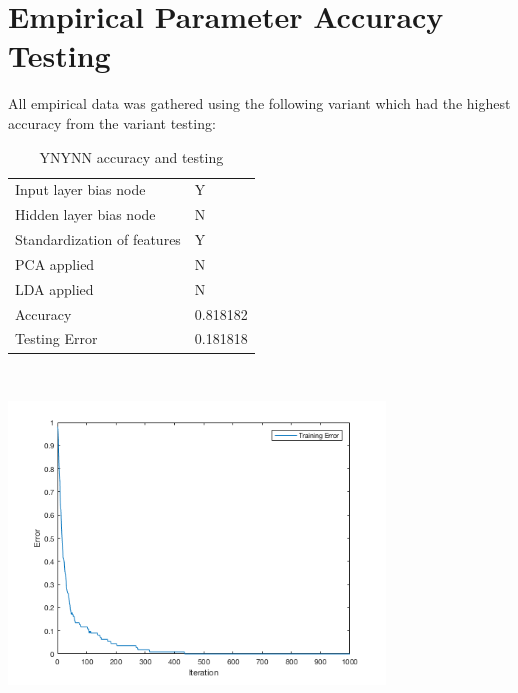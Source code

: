 \documentclass[12pt]{article}
\newcommand{\accuracyAndTestErrorTable}[8]{
  \begin{tabular}{l|l}
    \hline
    Input layer bias node & #1 \\
    Hidden layer bias node & #2 \\
    Standardization of features & #3 \\
    PCA applied & #4 \\
    LDA applied & #5 \\
    \hline
    Accuracy & #6 \\
    Testing Error & #7 \\
    \hline
  \end{tabular}
  ~\\[60pt]
  \caption{#8}
}
\begin{document}

\section{Empirical Parameter Accuracy Testing}
All empirical data was gathered using the following variant which had the highest accuracy from the variant testing:
\begin{center}
  \begin{table}[H]
    \begin{varwidth}[b]{0.4\linewidth}
      \centering
      \accuracyAndTestErrorTable{Y}{N}{Y}{N}{N}{0.818182}{0.181818}{YNYNN accuracy and testing}
      \label{table:param_base}
    \end{varwidth}%
    \hfill
    \begin{minipage}[b]{0.6\linewidth}
      \centering
      \includegraphics[width=100mm]{YNYNN_training_error.png}
      \label{fig:param_base}
    \end{minipage}
  \end{table}
\end{center}
\end{document}
